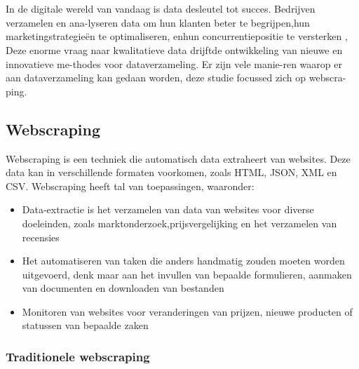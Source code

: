 \chapter{}%
\label{ch:stand-van-zaken}



In de digitale wereld van vandaag is data desleutel tot succes. Bedrijven verzamelen en ana-lyseren data om hun klanten beter te begrijpen,hun marketingstrategieën te optimaliseren, enhun concurrentiepositie te versterken \autocite{},
Deze enorme vraag naar kwalitatieve data drijftde ontwikkeling van nieuwe en innovatieve me-thodes voor dataverzameling. Er zijn vele manie-ren waarop er aan dataverzameling kan gedaan worden, deze studie focussed zich op webscra-ping.

\section{Webscraping}
Webscraping is een techniek die automatisch
data extraheert van websites. Deze data kan in
verschillende formaten voorkomen, zoals HTML,
JSON, XML en CSV. Webscraping heeft tal van toepassingen,
waaronder:
\begin{itemize}
    \item Data-extractie is het verzamelen van data van websites voor diverse doeleinden,
    zoals marktonderzoek,prijsvergelijking en het verzamelen van recensies
    \item Het automatiseren van taken die anders handmatig zouden moeten worden uitgevoerd, denk maar
    aan het invullen van bepaalde formulieren, aanmaken van documenten en downloaden van bestanden
    \item Monitoren van websites voor veranderingen van prijzen, nieuwe producten of statussen van bepaalde zaken
\end{itemize}

\subsection{Traditionele webscraping}

